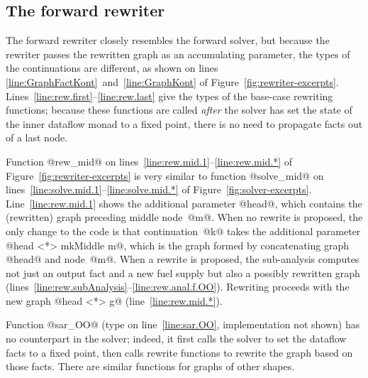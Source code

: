 \documentclass[blockstyle,preprint,natbib,nocopyrightspace]{sigplanconf}
\newcommand\lineref[1]{line~\ref{line:#1}}
\newcommand\linepairref[2]{lines \ref{line:#1}~and~\ref{line:#2}}
\newcommand\linerangeref[2]{\mbox{lines~\ref{line:#1}--\ref{line:#2}}}
\newcommand\Lineref[1]{Line~\ref{line:#1}}
\newcommand\Linerangeref[2]{\mbox{Lines~\ref{line:#1}--\ref{line:#2}}}
\newcommand{\authornote}[1]{{\em #1}}
\def\authornote#1{\unskip\relax}
\newcommand{\norman}[1]{\authornote{NR: #1}}
\let\remark\norman
\newcommand\seclabel[1]{\label{sec:#1}}
\newcommand\figref[1]{Figure~\ref{fig:#1}}
\begin{document}
\subsection{The forward rewriter}

\seclabel{forward-rewriter}

The forward rewriter closely resembles the
forward solver, but because the rewriter passes the rewritten graph as
an accumulating parameter, the types of the continuations are
different, as shown on \linepairref{GraphFactKont}{GraphKont} of
\figref{rewriter-excerpts}. 
\Linerangeref{rew.first}{rew.last} give the types of the base-case
rewriting functions; because these functions are called \emph{after}
the solver has set the state of the inner dataflow monad to a fixed
point, there is no need to propagate facts out of a last node.

Function @rew_mid@ on \linerangeref{rew.mid.1}{rew.mid.*} of
\figref{rewriter-excerpts} is very similar to function @solve_mid@ on 
\linerangeref{solve.mid.1}{solve.mid.*} of \figref{solver-excerpts}.
\Lineref{rew.mid.1} shows the additional parameter @head@, which
contains the (rewritten) graph preceding middle node~@m@.
When no rewrite is proposed, the only change to the code is that
continuation~@k@ takes the additional parameter
@head <*> mkMiddle m@,
which is the graph formed by concatenating graph @head@ and node~@m@. 
When a rewrite is proposed, the sub-analysis computes not just an
output fact and a new fuel supply but also a possibly rewritten graph
(\linerangeref{rew.subAnalysis}{rew.anal.f.OO}).
Rewriting proceeds with the new graph @head <*> g@
(\lineref{rew.mid.*}).
\remark{Need to be sure that we say @<*>@ is splicing and cite ML
workshop paper}

Function @sar_OO@ (type on \lineref{sar.OO}, implementation not shown)
has no counterpart in the solver; 
indeed, it first calls the solver to set the dataflow facts to a fixed
point, then calls rewrite functions to rewrite the graph based on
those facts.
There are similar functions for graphs of other shapes.
\end{document}
